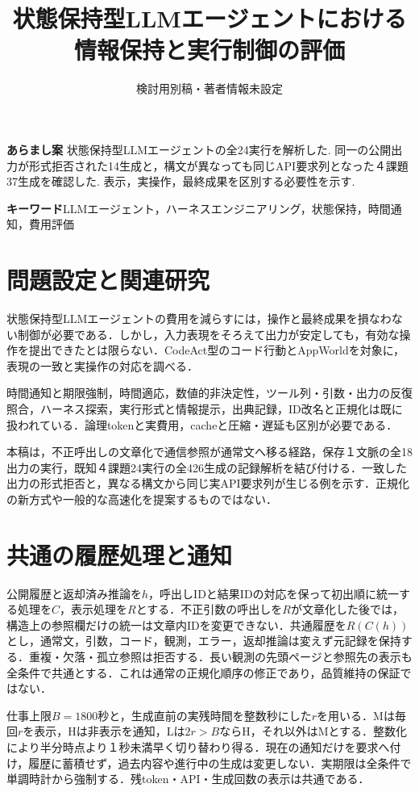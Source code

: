 \documentclass[uplatex,a4paper,twocolumn,10pt]{jsarticle}
\title{状態保持型LLMエージェントにおける\newline 情報保持と実行制御の評価}
\author{検討用別稿・著者情報未設定}
\date{}
\begin{document}
\raggedbottom
\maketitle
\noindent\textbf{あらまし案}\quad
状態保持型LLMエージェントの全24実行を解析した. 同一の公開出力が形式拒否された14生成と，構文が異なっても同じAPI要求列となった４課題37生成を確認した. 表示，実操作，最終成果を区別する必要性を示す.

\noindent\textbf{キーワード}\quad LLMエージェント，ハーネスエンジニアリング，状態保持，時間通知，費用評価

\section{問題設定と関連研究}
状態保持型LLMエージェントの費用を減らすには，操作と最終成果を損なわない制御が必要である．しかし，入力表現をそろえて出力が安定しても，有効な操作を提出できたとは限らない．CodeAct\cite{codeact}型のコード行動とAppWorld\cite{appworld}を対象に，表現の一致と実操作の対応を調べる．

時間通知と期限強制\cite{clock}，時間適応\cite{timely}，数値的非決定性\cite{nondeterminism}，ツール列・引数・出力の反復照合\cite{consistency}，ハーネス探索\cite{beyondprompts}，実行形式\cite{localprotocol}と情報提示\cite{delivery}，出典記録\cite{repro}，ID改名と正規化\cite{canonical}は既に扱われている．論理tokenと実費用\cite{costproxy}，cacheと圧縮・遅延\cite{capc,cacheeval}も区別が必要である．

本稿は，不正呼出しの文章化で通信参照が通常文へ移る経路，保存１文脈の全18出力の実行，既知４課題24実行の全426生成の記録解析を結び付ける．一致した出力の形式拒否と，異なる構文から同じ実API要求列が生じる例を示す．正規化の新方式や一般的な高速化を提案するものではない．

\section{共通の履歴処理と通知}
公開履歴と返却済み推論を$h$，呼出しIDと結果IDの対応を保って初出順に統一する処理を$C$，表示処理を$R$とする．不正引数の呼出しを$R$が文章化した後では，構造上の参照欄だけの統一は文章内IDを変更できない．共通履歴を$R(C(h))$とし，通常文，引数，コード，観測，エラー，返却推論は変えず元記録を保持する．重複・欠落・孤立参照は拒否する．長い観測の先頭ページと参照先の表示も全条件で共通とする．これは通常の正規化順序の修正であり，品質維持の保証ではない．

仕事上限$B=1800$秒と，生成直前の実残時間を整数秒にした$r$を用いる．Mは毎回$r$を表示，Hは非表示を通知，Lは$2r>B$ならH，それ以外はMとする．整数化により半分時点より１秒未満早く切り替わり得る．現在の通知だけを要求へ付け，履歴に蓄積せず，過去内容や進行中の生成は変更しない．実期限は全条件で単調時計から強制する．残token・API・生成回数の表示は共通である．
\end{document}
